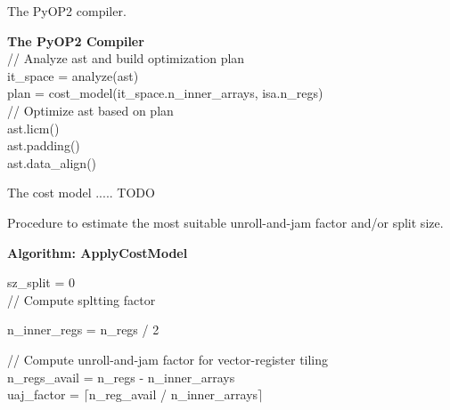 \documentclass[conference]{IEEEtran}
\begin{document}
\begin{algorithm}[t]
\caption{The PyOP2 compiler.}
\label{algo:PyOP2Compiler}
  \textbf{The PyOP2 Compiler}\\
// Analyze ast and build optimization plan \\
it\_space = analyze(ast) \\
plan = cost\_model(it\_space.n\_inner\_arrays, isa.n\_regs) \\
// Optimize ast based on plan \\
ast.licm() \\
ast.padding() \\
ast.data\_align() \\
\end{algorithm}


The cost model ..... TODO

\begin{algorithm}[t]
\caption{Procedure to estimate the most suitable unroll-and-jam factor and/or split size.}
\label{algo:applyCostModel}
  \textbf{Algorithm: ApplyCostModel}\\


sz\_split = 0 \\
// Compute spltting factor \\

n\_inner\_regs = n\_regs / 2 \\

// Compute unroll-and-jam factor for vector-register tiling \\
n\_regs\_avail = n\_regs - n\_inner\_arrays \\
uaj\_factor = $\lceil$n\_reg\_avail / n\_inner\_arrays$\rceil$ \\
\end{algorithm}
\end{document}
